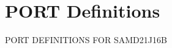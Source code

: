 \hypertarget{group___s_a_m_d21_j16_b__port}{}\section{P\+O\+RT Definitions}
\label{group___s_a_m_d21_j16_b__port}
P\+O\+RT D\+E\+F\+I\+N\+I\+T\+I\+O\+NS F\+OR S\+A\+M\+D21\+J16B 